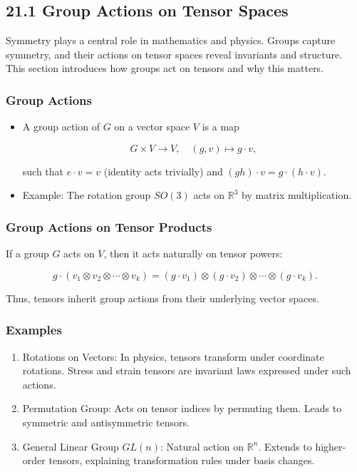 \documentclass[
  letterpaper,
  DIV=11,
  numbers=noendperiod]{scrreprt}
\begin{document}
\subsection{21.1 Group Actions on Tensor
Spaces}\label{group-actions-on-tensor-spaces}

Symmetry plays a central role in mathematics and physics. Groups capture
symmetry, and their actions on tensor spaces reveal invariants and
structure. This section introduces how groups act on tensors and why
this matters.

\subsubsection{Group Actions}\label{group-actions}

\begin{itemize}
\item
  A group action of \(G\) on a vector space \(V\) is a map

  \[
  G \times V \to V, \quad (g,v) \mapsto g \cdot v,
  \]

  such that \(e \cdot v = v\) (identity acts trivially) and
  \((gh)\cdot v = g\cdot(h\cdot v)\).
\item
  Example: The rotation group \(SO(3)\) acts on \(\mathbb{R}^3\) by
  matrix multiplication.
\end{itemize}

\subsubsection{Group Actions on Tensor
Products}\label{group-actions-on-tensor-products}

If a group \(G\) acts on \(V\), then it acts naturally on tensor powers:

\[
g \cdot (v_1 \otimes v_2 \otimes \cdots \otimes v_k)
= (g \cdot v_1) \otimes (g \cdot v_2) \otimes \cdots \otimes (g \cdot v_k).
\]

Thus, tensors inherit group actions from their underlying vector spaces.

\subsubsection{Examples}\label{examples-2}

\begin{enumerate}
\def\labelenumi{\arabic{enumi}.}
\item
  Rotations on Vectors: In physics, tensors transform under coordinate
  rotations. Stress and strain tensors are invariant laws expressed
  under such actions.
\item
  Permutation Group: Acts on tensor indices by permuting them. Leads to
  symmetric and antisymmetric tensors.
\item
  General Linear Group \(GL(n)\): Natural action on \(\mathbb{R}^n\).
  Extends to higher-order tensors, explaining transformation rules under
  basis changes.
\end{enumerate}
\end{document}
